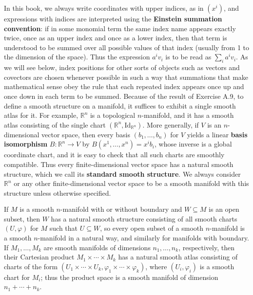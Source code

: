 In this book, we always write coordinates with upper indices, as in $(x^i)$, and expressions with indices are interpreted using the \textbf{Einstein summation convention}: if in some monomial term the same index name appears exactly twice, once as an upper index and once as a lower index, then that term is understood to be summed over all possible values of that index (usually from 1 to the dimension of the space). Thus the expression $a^i v_i$ is to be read as $\sum_i a^i v_i$. As we will see below, index positions for other sorts of objects such as vectors and covectors are chosen whenever possible in such a way that summations that make mathematical sense obey the rule that each repeated index appears once up and once down in each term to be summed. Because of the result of Exercise A.9, to define a smooth structure on a manifold, it suffices to exhibit a single smooth atlas for it. For example, $\mathbb{R}^n$ is a topological $n$-manifold, and it has a smooth atlas consisting of the single chart $(\mathbb{R}^n, \mathrm{Id}_{\mathbb{R}^n})$. More generally, if $V$ is an $n$-dimensional vector space, then every basis $(b_1, \ldots, b_n)$ for $V$ yields a linear \textbf{basis isomorphism} $B: \mathbb{R}^n \to V$ by $B(x^1, \ldots, x^n) = x^i b_i$, whose inverse is a global coordinate chart, and it is easy to check that all such charts are smoothly compatible. Thus every finite-dimensional vector space has a natural smooth structure, which we call its \textbf{standard smooth structure}. We always consider $\mathbb{R}^n$ or any other finite-dimensional vector space to be a smooth manifold with this structure unless otherwise specified.

If $M$ is a smooth $n$-manifold with or without boundary and $W \subseteq M$ is an open subset, then $W$ has a natural smooth structure consisting of all smooth charts $(U, \varphi)$ for $M$ such that $U \subseteq W$, so every open subset of a smooth $n$-manifold is a smooth $n$-manifold in a natural way, and similarly for manifolds with boundary. If $M_1, \ldots, M_k$ are smooth manifolds of dimensions $n_1, \ldots, n_k$, respectively, then their Cartesian product $M_1 \times \cdots \times M_k$ has a natural smooth atlas consisting of charts of the form $(U_1 \times \cdots \times U_k, \varphi_1 \times \cdots \times \varphi_k)$, where $(U_i, \varphi_i)$ is a smooth chart for $M_i$; thus the product space is a smooth manifold of dimension $n_1 + \cdots + n_k$.

